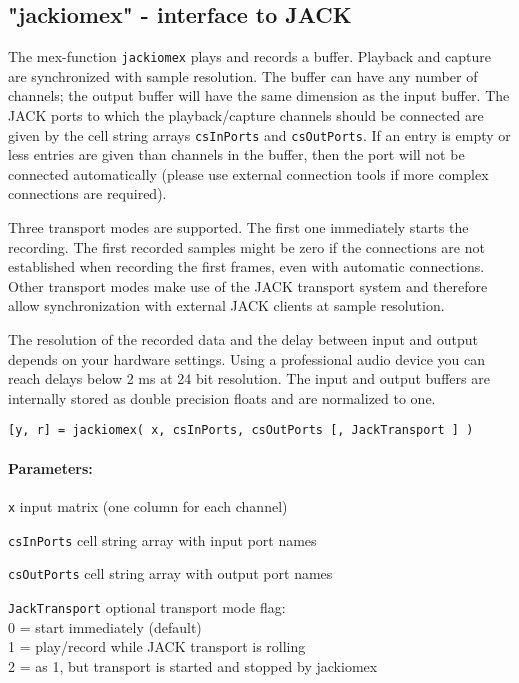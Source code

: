 
\subsection{"jackiomex" - \Matlab{} interface to JACK}
\label{sec:jackiomex}

The \Matlab{} mex-function \verb!jackiomex! plays and records a
\Matlab{} buffer. Playback and capture are synchronized with sample
resolution. The buffer can have any number of channels; the output
buffer will have the same dimension as the input buffer. The JACK
ports to which the playback/capture channels should be connected are
given by the cell string arrays \verb!csInPorts! and
\verb!csOutPorts!. If an entry is empty or less entries are given than
channels in the buffer, then the port will not be connected
automatically (please use external connection tools if more complex
connections are required).

Three transport modes are supported. The first one immediately starts
the recording. The first recorded samples might be zero if the
connections are not established when recording the first frames, even
with automatic connections. Other transport modes make use of the JACK
transport system and therefore allow synchronization with external
JACK clients at sample resolution.

The resolution of the recorded data and the delay between input and
output depends on your hardware settings. Using a professional audio
device you can reach delays below 2 ms at 24 bit resolution. The input
and output buffers are internally stored as double precision floats
and are normalized to one.

\begin{verbatim}
[y, r] = jackiomex( x, csInPorts, csOutPorts [, JackTransport ] )
\end{verbatim}

\paragraph{Parameters:}
\begin{description}
\item{\tt x} input matrix (one column for each channel)
\item{\tt csInPorts} cell string array with input port names
\item{\tt csOutPorts} cell string array with output port names
\item{\tt JackTransport} optional transport mode flag:\\
0 = start immediately (default)\\
1 = play/record while JACK transport is rolling\\
2 = as 1, but transport is started and stopped by jackiomex
\end{description}
